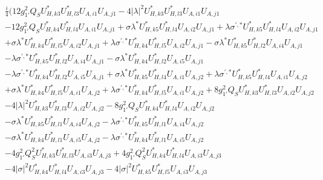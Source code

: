 \begin{align} 
 &\frac{i}{4} \Big(12 g_{1'}^{2} Q_{S} U^*_{{H},{k 3}} U^*_{{H},{l 3}} U_{A,{i 1}} U_{A,{j 1}} -4 |\lambda|^2 U^*_{{H},{k 3}} U^*_{{H},{l 3}} U_{A,{i 1}} U_{A,{j 1}} \nonumber \\ 
 &-12 g_{1'}^{2} Q_{S} U^*_{{H},{k 4}} U^*_{{H},{l 4}} U_{A,{i 1}} U_{A,{j 1}} +\sigma \lambda^* U^*_{{H},{k 5}} U^*_{{H},{l 4}} U_{A,{i 2}} U_{A,{j 1}} +\lambda \sigma^{\prime,*} U^*_{{H},{k 5}} U^*_{{H},{l 4}} U_{A,{i 2}} U_{A,{j 1}} \nonumber \\ 
 &+\sigma \lambda^* U^*_{{H},{k 4}} U^*_{{H},{l 5}} U_{A,{i 2}} U_{A,{j 1}} +\lambda \sigma^{\prime,*} U^*_{{H},{k 4}} U^*_{{H},{l 5}} U_{A,{i 2}} U_{A,{j 1}} - \sigma \lambda^* U^*_{{H},{k 5}} U^*_{{H},{l 2}} U_{A,{i 4}} U_{A,{j 1}} \nonumber \\ 
 &- \lambda \sigma^{\prime,*} U^*_{{H},{k 5}} U^*_{{H},{l 2}} U_{A,{i 4}} U_{A,{j 1}} - \sigma \lambda^* U^*_{{H},{k 4}} U^*_{{H},{l 2}} U_{A,{i 5}} U_{A,{j 1}} \nonumber \\ 
 &- \lambda \sigma^{\prime,*} U^*_{{H},{k 4}} U^*_{{H},{l 2}} U_{A,{i 5}} U_{A,{j 1}} +\sigma \lambda^* U^*_{{H},{k 5}} U^*_{{H},{l 4}} U_{A,{i 1}} U_{A,{j 2}} +\lambda \sigma^{\prime,*} U^*_{{H},{k 5}} U^*_{{H},{l 4}} U_{A,{i 1}} U_{A,{j 2}} \nonumber \\ 
 &+\sigma \lambda^* U^*_{{H},{k 4}} U^*_{{H},{l 5}} U_{A,{i 1}} U_{A,{j 2}} +\lambda \sigma^{\prime,*} U^*_{{H},{k 4}} U^*_{{H},{l 5}} U_{A,{i 1}} U_{A,{j 2}} +8 g_{1'}^{2} Q_{S} U^*_{{H},{k 3}} U^*_{{H},{l 3}} U_{A,{i 2}} U_{A,{j 2}} \nonumber \\ 
 &-4 |\lambda|^2 U^*_{{H},{k 3}} U^*_{{H},{l 3}} U_{A,{i 2}} U_{A,{j 2}} -8 g_{1'}^{2} Q_{S} U^*_{{H},{k 4}} U^*_{{H},{l 4}} U_{A,{i 2}} U_{A,{j 2}} \nonumber \\ 
 &- \sigma \lambda^* U^*_{{H},{k 5}} U^*_{{H},{l 1}} U_{A,{i 4}} U_{A,{j 2}} - \lambda \sigma^{\prime,*} U^*_{{H},{k 5}} U^*_{{H},{l 1}} U_{A,{i 4}} U_{A,{j 2}} \nonumber \\ 
 &- \sigma \lambda^* U^*_{{H},{k 4}} U^*_{{H},{l 1}} U_{A,{i 5}} U_{A,{j 2}} - \lambda \sigma^{\prime,*} U^*_{{H},{k 4}} U^*_{{H},{l 1}} U_{A,{i 5}} U_{A,{j 2}} \nonumber \\ 
 &-4 g_{1'}^{2} Q_{S}^{2} U^*_{{H},{k 3}} U^*_{{H},{l 3}} U_{A,{i 3}} U_{A,{j 3}} +4 g_{1'}^{2} Q_{S}^{2} U^*_{{H},{k 4}} U^*_{{H},{l 4}} U_{A,{i 3}} U_{A,{j 3}} \nonumber \\ 
 &-4 |\sigma|^2 U^*_{{H},{k 4}} U^*_{{H},{l 4}} U_{A,{i 3}} U_{A,{j 3}} -4 |\sigma|^2 U^*_{{H},{k 5}} U^*_{{H},{l 5}} U_{A,{i 3}} U_{A,{j 3}} \nonumber \\ 

\end{align}
